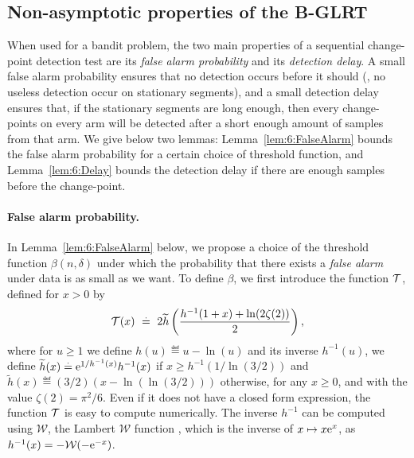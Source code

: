 \subsection{Non-asymptotic properties of the B-GLRT}\label{subsec:6:PropGLR}

When used for a bandit problem, the two main properties of a sequential change-point detection test are its \emph{false alarm probability} and its \emph{detection delay}.
%
A small false alarm probability ensures that no detection occurs before it should (\ie, no useless detection occur on stationary segments), and a small detection delay ensures that, if the stationary segments are long enough, then every change-points on every arm will be detected after a short enough amount of samples from that arm.
%
We give below two lemmas:
Lemma~\ref{lem:6:FalseAlarm} bounds the false alarm probability for a certain choice of threshold function,
and Lemma~\ref{lem:6:Delay} bounds the detection delay if there are enough samples before the change-point.


\paragraph{False alarm probability.}\label{par:6:falseAlarm}
%
In Lemma~\ref{lem:6:FalseAlarm} below, we propose a choice of the threshold function $\beta(n,\delta)$ under which the probability that there exists a \emph{false alarm} under \iid{} data is as small as we want.
To define $\beta$, we first introduce the function $\mathcal{T}$, defined for $x>0$ by
%
\begin{equation}\label{def:6:function_T}
    \mathcal{T}(x) ~ \overset{.}{=} ~ 2 \widetilde{h}\left(\frac{h^{-1}(1+x) + \ln(2\zeta(2))}{2}\right),
\end{equation}
where for $u \ge 1$ we define $h(u) \eqdef u - \ln(u)$ and its inverse $h^{-1}(u)$,
%
we define $\widetilde{h}(x) \overset{.}{=} \mathrm{e}^{1/h^{-1}(x)} h^{-1}(x)$ if $x \ge h^{-1}(1/\ln (3/2))$ and $\widetilde{h}(x) \eqdef (3/2) (x-\ln(\ln (3/2)))$ otherwise, for any $x \ge 0$,
and with the value $\zeta(2) = \pi^2 / 6$.
%
Even if it does not have a closed form expression, the function $\mathcal{T}$ is easy to compute numerically.
%
The inverse $h^{-1}$ can be computed using $\mathcal{W}$, the Lambert $\mathcal{W}$ function \cite{Corless96}, which is the inverse of $x \mapsto x \mathrm{e}^x$, as $h^{-1}(x) = - \mathcal{W}(- \mathrm{e}^{-x})$.


